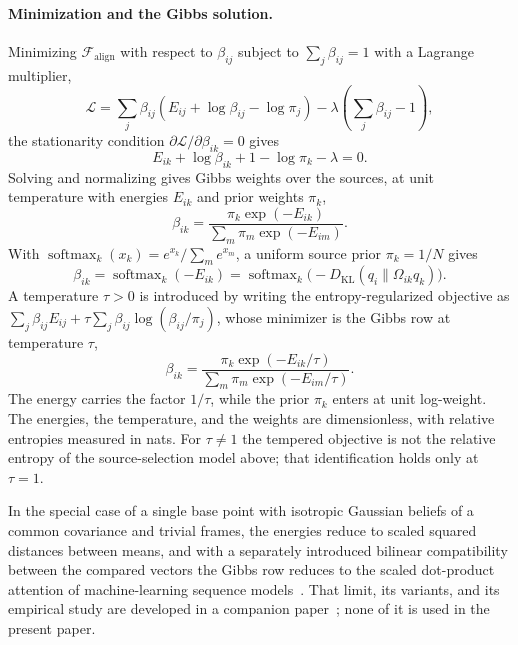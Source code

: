 \paragraph{Minimization and the Gibbs solution.}
Minimizing $\mathcal{F}_{\text{align}}$ with respect to $\beta_{ij}$ subject to $\sum_j \beta_{ij} = 1$ with a Lagrange multiplier,
\begin{equation}
\mathcal{L} = \sum_j \beta_{ij}(E_{ij} + \log \beta_{ij} - \log \pi_j) - \lambda\left(\sum_j \beta_{ij} - 1\right),
\end{equation}
the stationarity condition $\partial \mathcal{L} / \partial \beta_{ik} = 0$ gives
\begin{equation}
E_{ik} + \log \beta_{ik} + 1 - \log \pi_k - \lambda = 0.
\end{equation}
Solving and normalizing gives Gibbs weights over the sources, at unit temperature with energies $E_{ik}$ and prior weights $\pi_k$,
\begin{equation}
\beta_{ik} = \frac{\pi_k \exp(-E_{ik})}{\sum_m \pi_m \exp(-E_{im})}.
\label{eq:softmax_attention_general}
\end{equation}
With $\operatorname{softmax}_k(x_k) = e^{x_k}/\sum_m e^{x_m}$, a uniform source prior $\pi_k = 1/N$ gives
\begin{equation}
\boxed{\beta_{ik} = \operatorname{softmax}_k(-E_{ik}) = \operatorname{softmax}_k\big(-D_{\mathrm{KL}}(q_i \| \Omega_{ik} q_k)\big).}
\label{eq:mixture_softmax}
\end{equation}
A temperature $\tau>0$ is introduced by writing the entropy-regularized objective as $\sum_j\beta_{ij}E_{ij}+\tau\sum_j\beta_{ij}\log(\beta_{ij}/\pi_j)$, whose minimizer is the Gibbs row at temperature $\tau$,
\begin{equation}
\beta_{ik}
= \frac{\pi_k\exp(-E_{ik}/\tau)}{\sum_m \pi_m\exp(-E_{im}/\tau)}.
\end{equation}
The energy carries the factor $1/\tau$, while the prior $\pi_k$ enters at unit log-weight. The energies, the temperature, and the weights are dimensionless, with relative entropies measured in nats. For $\tau \neq 1$ the tempered objective is not the relative entropy of the source-selection model above; that identification holds only at $\tau = 1$.

In the special case of a single base point with isotropic Gaussian beliefs of a common covariance and trivial frames, the energies reduce to scaled squared distances between means, and with a separately introduced bilinear compatibility between the compared vectors the Gibbs row reduces to the scaled dot-product attention of machine-learning sequence models~\cite{vaswani2017attention}. That limit, its variants, and its empirical study are developed in a companion paper~\cite{DennisGLKAttention2026}; none of it is used in the present paper.

